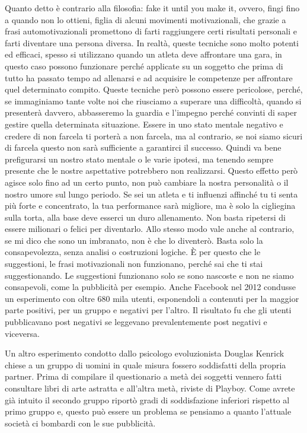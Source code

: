 \documentclass[12pt]{book} %
\begin{document}
Quanto detto è contrario alla filosofia: fake it until you make it, ovvero, fingi fino a quando non lo ottieni, figlia
di alcuni movimenti motivazionali, che grazie a frasi automotivazionali promettono di farti raggiungere certi risultati
personali e farti diventare una persona diversa. In realtà, queste tecniche sono molto potenti ed efficaci, spesso si
utilizzano quando un atleta deve affrontare una gara, in questo caso possono funzionare perché applicate su un soggetto che prima di tutto ha passato tempo ad allenarsi e ad acquisire le competenze per affrontare quel determinato compito. Queste tecniche però possono essere pericolose, perché, se
immaginiamo tante volte noi che riusciamo a superare una difficoltà, quando si presenterà davvero, abbasseremo la
guardia e l'impegno perché convinti di saper gestire quella determinata situazione. Essere in uno
stato mentale negativo e credere di non farcela ti porterà a non farcela, ma al contrario, se noi siamo sicuri di
farcela questo non sarà sufficiente a garantirci il successo. Quindi va bene prefigurarsi un nostro stato mentale o le
varie ipotesi, ma tenendo sempre presente che le nostre aspettative potrebbero non realizzarsi. Questo effetto però
agisce solo fino ad un certo punto, non può cambiare la nostra personalità o il nostro umore sul lungo periodo. Se sei
un atleta e ti influenzi affinché tu ti senta più forte e concentrato, la tua performance sarà migliore, ma è solo la
cigliegina sulla torta, alla base deve esserci un duro allenamento. Non basta ripetersi di essere milionari o felici
per diventarlo. Allo stesso modo vale anche al contrario, se mi dico che sono un imbranato, non è che lo diventerò.
Basta solo la consapevolezza, senza analisi o costruzioni logiche. È per questo che le suggestioni, le frasi
motivazionali non funzionano, perché sai che ti stai suggestionando. Le suggestioni funzionano solo se sono nascoste e
non ne siamo consapevoli, come la pubblicità per esempio. Anche Facebook nel 2012 condusse un esperimento con oltre 680
mila utenti, esponendoli a contenuti per la maggior parte positivi, per un gruppo e negativi per
l'altro. Il risultato fu che gli utenti pubblicavano post negativi se leggevano prevalentemente
post negativi e viceversa.

Un altro esperimento condotto dallo psicologo evoluzionista Douglas Kenrick chiese a un gruppo di uomini in quale misura
fossero soddisfatti della propria partner. Prima di compilare il questionario a metà dei soggetti vennero fatti
consultare libri di arte astratta e all'altra metà, riviste di Playboy. Come avrete già intuito il
secondo gruppo riportò gradi di soddisfazione inferiori rispetto al primo gruppo e, questo può essere un problema se
pensiamo a quanto l'attuale società ci bombardi con le sue pubblicità.
\end{document}
